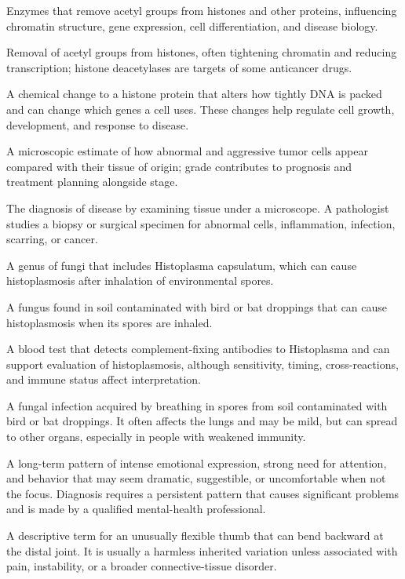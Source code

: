  Enzymes that remove acetyl groups from histones and other proteins, influencing chromatin structure, gene expression, cell differentiation, and disease biology.

 Removal of acetyl groups from histones, often tightening chromatin and reducing transcription; histone deacetylases are targets of some anticancer drugs.

 A chemical change to a histone protein that alters how tightly DNA is packed and can change which genes a cell uses. These changes help regulate cell growth, development, and response to disease.

 A microscopic estimate of how abnormal and aggressive tumor cells appear compared with their tissue of origin; grade contributes to prognosis and treatment planning alongside stage.

 The diagnosis of disease by examining tissue under a microscope. A pathologist studies a biopsy or surgical specimen for abnormal cells, inflammation, infection, scarring, or cancer.

 A genus of fungi that includes Histoplasma capsulatum, which can cause histoplasmosis after inhalation of environmental spores.

 A fungus found in soil contaminated with bird or bat droppings that can cause histoplasmosis when
its spores are inhaled.

 A blood test that detects complement-fixing antibodies to Histoplasma and can support evaluation of histoplasmosis, although sensitivity, timing, cross-reactions, and immune status affect interpretation.

 A fungal infection acquired by breathing in spores from soil contaminated with bird or bat droppings. It often affects the lungs and may be mild, but can spread to other organs, especially in people with weakened immunity.

 A long-term pattern of intense emotional expression, strong need for attention, and behavior that may seem dramatic, suggestible, or uncomfortable when not the focus. Diagnosis requires a persistent pattern that causes significant problems and is made by a qualified mental-health professional.

 A descriptive term for an unusually flexible thumb that can bend backward at the distal joint. It is usually a harmless inherited variation unless associated with pain, instability, or a broader connective-tissue disorder.

